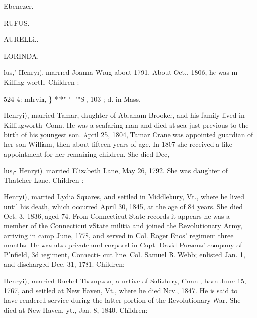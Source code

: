 \documentclass{book}
\begin{document}
Ebenezer. 




RUFUS. 




AURELLi.. 




LORINDA. 




lus,' Henryi), married Joanna Wiug about 1791. About Oct., 
1806, he was in Killing worth. Children : 


524-4: mIrvin, \} *'*" '- ""S-, 103 ; d. in Mass. 

Henryi), married Tamar, daughter of Abraham Brooker, and 
his family lived in Killiugworth, Conn. He was a seafaring man 
and died at sea just previous to the birth of his youngest son. 
April 25, 1804, Tamar Crane was appointed guardian of her son 
William, then about fifteen years of age. In 1807 she received a 
like appointment for her remaining children. She died Dec, 







lus,- Henryi), married Elizabeth Lane, May 26, 1792. She was 
daughter of Thatcher Lane. Children : 










Henryi), married Lydia Squares, and settled in Middlebury, Vt., 
where he lived until his death, which occurred April 30, 1845, at 
the age of 84 years. She died Oct. 3, 1836, aged 74. From 
Connecticut State records it appears he was a member of the 
Connecticut vState militia and joined the Revolutionary Army, 
arriving in camp June, 1778, and served in Col. Roger Enos' 
regiment three months. He was also private and corporal in 
Capt. David Parsons' company of P'nfield, 3d regiment, Connecti- 
cut line. Col. Samuel B. Webb; enlisted Jan. 1, and discharged 
Dec. 31, 1781. Children: 








Henryi), married Rachel Thompson, a native of Salisbury, Conn., 
born June 15, 1767, and settled at New Haven, Vt., where he 
died Nov., 1847. He is said to have rendered service during the 
latter portion of the Revolutionary War. She died at New 
Haven, yt., Jan. 8, 1840. Children: 
\end{document}
